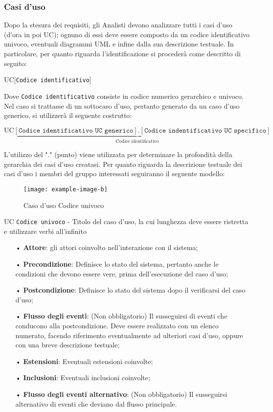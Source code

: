 \subsubsection{Casi d'uso}
Dopo la stesura dei requisiti, gli Analisti devono analizzare tutti i casi d'uso (d'ora in poi UC); ognuno di essi deve essere composto da un codice identificativo univoco, eventuali diagrammi UML e infine dalla sua descrizione testuale. In particolare, per quanto riguarda l'identificazione si procederà come descritto di seguito:
\begin{center}
UC[\texttt{Codice identificativo}]
\end{center}
Dove \texttt{Codice identificativo} consiste in codice numerico {gerarchico} e univoco.
Nel caso si trattasse di un {sottocaso d'uso}, pertanto generato da un caso d'uso generico, si utilizzerà il seguente costrutto:
\begin{center}
$\text{UC}\underbrace{[\texttt{Codice identificativo UC generico}].[\texttt{Codice indentificativo UC specifico}]}_{\text{Codice   identificativo}}$
\end{center}
L'utilizzo del "." (punto) viene utilizzata per determinare la profondità della gerarchia dei casi d'uso creatasi.
Per quanto riguarda la descrizione testuale dei casi d'uso i membri del gruppo interessati seguiranno il seguente modello:
\begin{figure}[H]
\centering
\texttt{[image: example-image-b]}
\caption{Caso d'uso Codice univoco}
\end{figure}
UC \texttt{Codice univoco} - Titolo del caso d'uso, la cui lunghezza deve essere ristretta e utilizzare verbi all'infinito
\begin{itemize}
\item[•] \textbf{Attore}: gli attori coinvolto nell'interazione con il sistema;
\item[•] \textbf{Precondizione}: Definisce lo stato del sistema, pertanto anche le condizioni che devono essere vere, prima dell'esecuzione del caso d'uso;
\item[•] \textbf{Postcondizione}: Definisce lo stato del sistema dopo il verificarsi del caso d'uso; 
\item[•] \textbf{Flusso degli eventi}: (Non obbligatorio) Il susseguirsi di eventi che conducono alla postcondizione. Deve essere realizzato con un elenco numerato, facendo riferimento eventualmente ad ulteriori casi d'uso, oppure con una breve descrizione testuale;
\item[•] \textbf{Estensioni}: Eventuali estensioni coinvolte;
\item[•] \textbf{Inclusioni}: Eventuali inclusioni coinvolte;
\item[•] \textbf{Flusso degli eventi alternativo}: (Non obbligatorio) Il susseguirsi alternativo di eventi che deviano dal flusso principale. 
\end{itemize}



